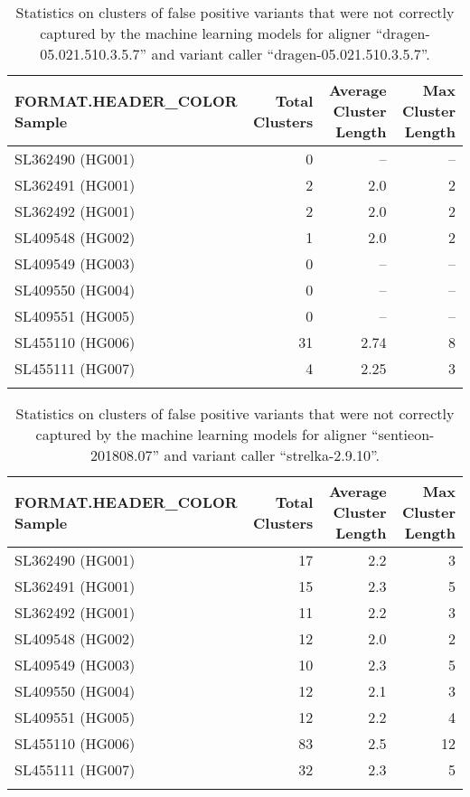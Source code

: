 \begin{longtable}{|l|r|r|r|}
    \hline
    {{ FORMAT.HEADER_COLOR }}
    \textbf{Sample}&\textbf{Total Clusters}&\textbf{Average Cluster Length}&\textbf{Max Cluster Length}\\ \hline
    \endhead
    SL362490 (HG001)&0&--&--\\ \hline
    SL362491 (HG001)&2&2.0&2\\ \hline
    SL362492 (HG001)&2&2.0&2\\ \hline
    SL409548 (HG002)&1&2.0&2\\ \hline
    SL409549 (HG003)&0&--&--\\ \hline
    SL409550 (HG004)&0&--&--\\ \hline
    SL409551 (HG005)&0&--&--\\ \hline
    SL455110 (HG006)&31&2.74&8\\ \hline
    SL455111 (HG007)&4&2.25&3\\ \hline
    \caption{Statistics on clusters of false positive variants that were not correctly captured by the machine learning models for aligner ``dragen-05.021.510.3.5.7'' and variant caller ``dragen-05.021.510.3.5.7''.}
    \label{tab:dragen-05.021.510.3.5.7_dragen-05.021.510.3.5.7_runs_summary}
\end{longtable}

\begin{longtable}{|l|r|r|r|}
    \hline
    {{ FORMAT.HEADER_COLOR }}
    \textbf{Sample}&\textbf{Total Clusters}&\textbf{Average Cluster Length}&\textbf{Max Cluster Length}\\ \hline
    \endhead
    SL362490 (HG001)&17&2.2&3\\ \hline
    SL362491 (HG001)&15&2.3&5\\ \hline
    SL362492 (HG001)&11&2.2&3\\ \hline
    SL409548 (HG002)&12&2.0&2\\ \hline
    SL409549 (HG003)&10&2.3&5\\ \hline
    SL409550 (HG004)&12&2.1&3\\ \hline
    SL409551 (HG005)&12&2.2&4\\ \hline
    SL455110 (HG006)&83&2.5&12\\ \hline
    SL455111 (HG007)&32&2.3&5\\ \hline
    \caption{Statistics on clusters of false positive variants that were not correctly captured by the machine learning models for aligner ``sentieon-201808.07'' and variant caller ``strelka-2.9.10''.}
    \label{tab:clinicalSS_runs_summary}
\end{longtable}

